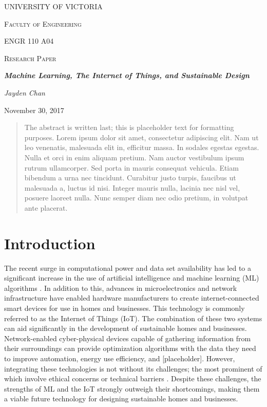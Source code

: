 \documentclass[letterpaper]{article}
\begin{document}
\begin{titlepage}
    \centering
    {\scshape\huge UNIVERSITY OF VICTORIA \par}
    \vspace{1cm}
    {\scshape\LARGE Faculty of Engineering \par\Large ENGR 110 A04\par}
    \vspace{1cm}
    {\scshape\Large Research Paper \par}
    \vspace{1.5cm}
    {\huge\bfseries \emph{Machine Learning, The Internet of Things, and Sustainable Design} \par}
    \vspace{2cm}
    {\Large\itshape Jayden Chan \par}
    \vfill
    {\large November 30, 2017\par}
\end{titlepage}

\pagestyle{customPage}

\begin{abstract}
    The abstract is written last; this is placeholder text for formatting purposes. Lorem ipsum dolor sit amet, consectetur adipiscing elit. Nam ut leo venenatis, malesuada elit in, efficitur massa. In sodales egestas egestas. Nulla et orci in enim aliquam pretium. Nam auctor vestibulum ipsum rutrum ullamcorper. Sed porta in mauris consequat vehicula. Etiam bibendum a urna nec tincidunt. Curabitur justo turpis, faucibus ut malesuada a, luctus id nisi. Integer mauris nulla, lacinia nec nisl vel, posuere laoreet nulla. Nunc semper diam nec odio pretium, in volutpat ante placerat.
\end{abstract}

\section{Introduction} \label{intro}
The recent surge in computational power and data set availability has led to a significant increase in the use of artificial intelligence and machine learning (ML) algorithms \cite{chan17}. In addition to this, advances in microelectronics and network infrastructure have enabled hardware manufacturers to create internet-connected smart devices for use in homes and businesses. This technology is commonly referred to as the Internet of Things (IoT). The combination of these two systems can aid significantly in the development of sustainable homes and businesses. Network-enabled cyber-physical devices capable of gathering information from their surroundings can provide optimization algorithms with the data they need to improve automation, energy use efficiency, and [placeholder]. However, integrating these technologies is not without its challenges; the most prominent of which involve ethical concerns or technical barriers \cite{perisic16, mccalman17, vlacheas13}. Despite these challenges, the strengths of ML and the IoT strongly outweigh their shortcomings, making them a viable future technology for designing sustainable homes and businesses.
\end{document}
